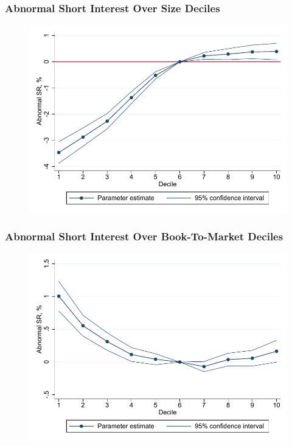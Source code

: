 \documentclass{beamer}
\begin{document}
\begin{frame}
\frametitle{Abnormal Short Interest Over Size Deciles}

\begin{figure}[htbp]
	\centering
	\includegraphics[scale=0.7,trim=4 4 4 4,clip]{figures/size_sr_by_decile_fe.pdf} 
	\label{tab:size_sr_by_decile_fe}%
\end{figure}
		\vspace*{-0.4cm}

\end{frame}
\begin{frame}

\frametitle{Abnormal Short Interest Over Book-To-Market Deciles}


\begin{figure}[htbp]
	\centering
	\includegraphics[scale=0.7,trim=4 4 4 4,clip]{figures/bm_sr_by_decile_fe.pdf} 
	\label{tab:bm_sr_by_decile_fe}%
\end{figure}
		\vspace*{-0.4cm}

\end{frame}
\end{document}
